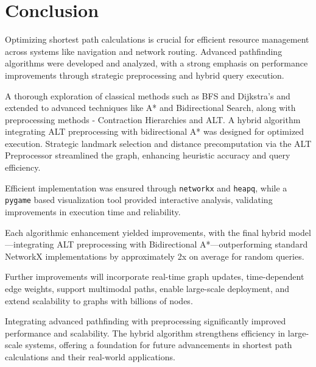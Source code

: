 \chapter{Conclusion}


Optimizing shortest path calculations is crucial for efficient resource management across systems like navigation and network routing. Advanced pathfinding algorithms were developed and analyzed, with a strong emphasis on performance improvements through strategic preprocessing and hybrid query execution.  \\ \medskip

A thorough exploration of classical methods such as BFS and Dijkstra’s and extended to advanced techniques like A* and Bidirectional Search, along with preprocessing methods - Contraction Hierarchies and ALT. A hybrid algorithm integrating ALT preprocessing with bidirectional A* was designed for optimized execution. Strategic landmark selection and distance precomputation via the ALT Preprocessor streamlined the graph, enhancing heuristic accuracy and query efficiency. \\ \medskip

Efficient implementation was ensured through \texttt{networkx} and \texttt{heapq}, while a \texttt{pygame} based visualization tool provided interactive analysis, validating improvements in execution time and reliability.  \\ \medskip

Each algorithmic enhancement yielded improvements, with the final hybrid model—integrating ALT preprocessing with Bidirectional A*—outperforming standard NetworkX implementations by approximately 2x on average for random queries. \\ \medskip

Further improvements will incorporate real-time graph updates, time-dependent edge weights, support multimodal paths, enable large-scale deployment, and extend scalability to graphs with billions of nodes.  \\ \medskip

Integrating advanced pathfinding with preprocessing significantly improved performance and scalability. The hybrid algorithm strengthens efficiency in large-scale systems, offering a foundation for future advancements in shortest path calculations and their real-world applications.